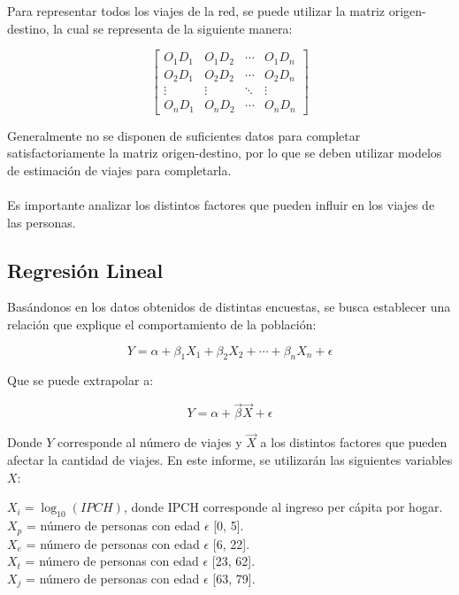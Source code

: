 \documentclass[12pt]{article} %
\begin{document}
Para representar todos los viajes de la red, se puede utilizar la matriz origen-destino, la cual se representa de la siguiente manera:

\begin{equation}
    \begin{bmatrix}
        O_{1}D_{1} & O_{1}D_{2} & \cdots & O_{1}D_{n} \\
        O_{2}D_{1} & O_{2}D_{2} & \cdots & O_{2}D_{n} \\
        \vdots & \vdots & \ddots & \vdots \\
        O_{n}D_{1} & O_{n}D_{2} & \cdots & O_{n}D_{n}
    \end{bmatrix}
\end{equation}

Generalmente no se disponen de suficientes datos para completar satisfactoriamente la matriz origen-destino, por lo que se deben utilizar modelos de estimación de viajes para completarla.
\\ \\
Es importante analizar los distintos factores que pueden influir en los viajes de las personas.

\subsection{Regresión Lineal}

Basándonos en los datos obtenidos de distintas encuestas, se busca establecer una relación que explique el comportamiento de la población:

\begin{equation}
    Y = \alpha + \beta_{1}X_{1} + \beta_{2}X_{2} + \cdots + \beta_{n}X_{n} + \epsilon
\end{equation}

Que se puede extrapolar a:

\begin{equation}
    Y = \alpha + \vec{\beta}\vec{X} + \epsilon
\end{equation}

Donde $Y$ corresponde al número de viajes y $\vec{X}$ a los distintos factores que pueden afectar la cantidad de viajes. En este informe, se utilizarán las siguientes variables $X$:

\begin{center}
    $X_i = \log_{10}(IPCH)$, donde IPCH corresponde al ingreso per cápita por hogar.\\
    $X_p$ = número de personas con edad $\epsilon$ [0, 5].\\
    $X_e$ = número de personas con edad $\epsilon$ [6, 22].\\
    $X_t$ = número de personas con edad $\epsilon$ [23, 62].\\
    $X_j$ = número de personas con edad $\epsilon$ [63, 79].
\end{center}
\end{document}
